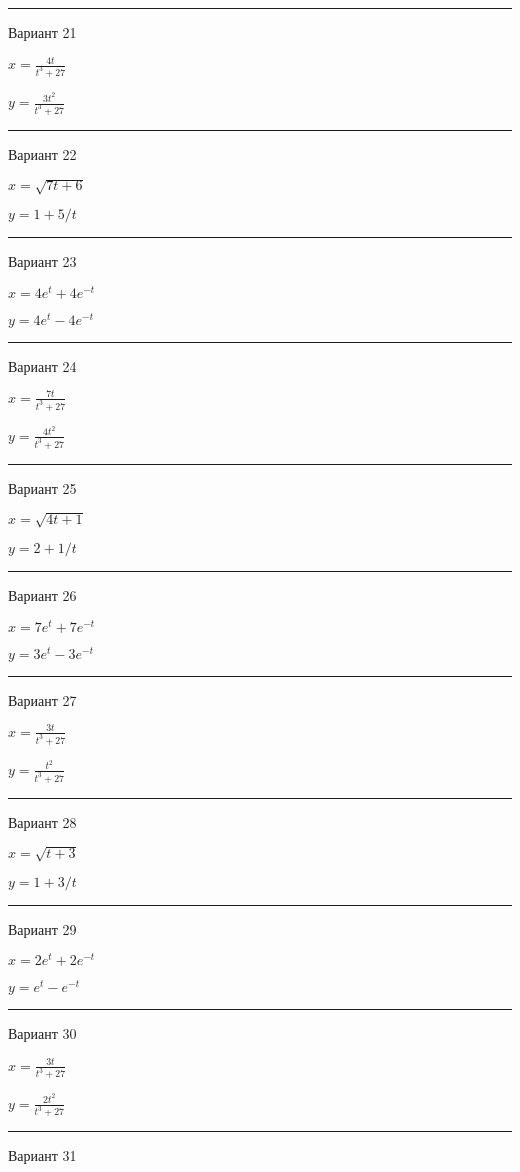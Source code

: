 \documentclass[11pt]{report}
\begin{document}
\rule{\textwidth}{.2mm}

 Вариант 21

$x = \frac{4 t}{t^{3} + 27}$

$y = \frac{3 t^{2}}{t^{3} + 27}$

\rule{\textwidth}{.2mm}

 Вариант 22

$x = \sqrt{7 t + 6}$

$y = 1 + 5 / t$

\rule{\textwidth}{.2mm}

 Вариант 23

$x = 4 e^{t} + 4 e^{- t}$

$y = 4 e^{t} - 4 e^{- t}$

\rule{\textwidth}{.2mm}

 Вариант 24

$x = \frac{7 t}{t^{3} + 27}$

$y = \frac{4 t^{2}}{t^{3} + 27}$

\rule{\textwidth}{.2mm}

 Вариант 25

$x = \sqrt{4 t + 1}$

$y = 2 + 1 / t$

\rule{\textwidth}{.2mm}

 Вариант 26

$x = 7 e^{t} + 7 e^{- t}$

$y = 3 e^{t} - 3 e^{- t}$

\rule{\textwidth}{.2mm}

 Вариант 27

$x = \frac{3 t}{t^{3} + 27}$

$y = \frac{t^{2}}{t^{3} + 27}$

\rule{\textwidth}{.2mm}

 Вариант 28

$x = \sqrt{t + 3}$

$y = 1 + 3 / t$

\rule{\textwidth}{.2mm}

 Вариант 29

$x = 2 e^{t} + 2 e^{- t}$

$y = e^{t} - e^{- t}$

\rule{\textwidth}{.2mm}

 Вариант 30

$x = \frac{3 t}{t^{3} + 27}$

$y = \frac{2 t^{2}}{t^{3} + 27}$

\rule{\textwidth}{.2mm}

 Вариант 31
\end{document}
